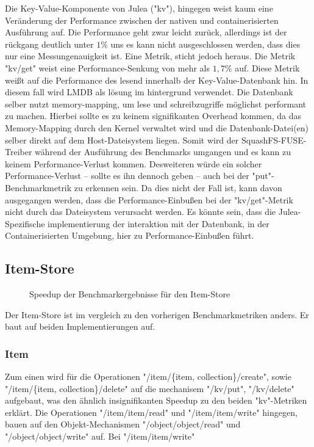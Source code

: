 \FloatBarrier

Die Key-Value-Komponente von Julea ("kv"), hingegen weist kaum eine Veränderung der Performance zwischen der nativen und containerisierten Ausführung auf. Die Performance geht zwar leicht zurück, allerdings ist der rückgang deutlich unter $1\%$ uns es kann nicht ausgeschlossen werden, dass dies nur eine Messungenauigkeit ist. Eine Metrik, sticht jedoch heraus. Die Metrik "kv/get" weist eine Performance-Senkung von mehr als $1,7\%$ auf. Diese Metrik weißt auf die Performance des lesend innerhalb der Key-Value-Datenbank hin. In diesem fall wird LMDB als lösung im hintergrund verwendet. Die Datenbank selber nutzt memory-mapping, um lese und schreibzugriffe möglichst performant zu machen. Hierbei sollte es zu keinem signifikanten Overhead kommen, da das Memory-Mapping durch den Kernel verwaltet wird und die Datenbank-Datei(en) selber direkt auf dem Host-Dateisystem liegen. Somit wird der SquashFS-FUSE-Treiber während der Ausführung des Benchmarks umgangen und es kann zu keinem Performance-Verlust kommen. Desweiteren würde ein solcher Performance-Verlust – sollte es ihn dennoch geben – auch bei der "put"-Benchmarkmetrik zu erkennen sein. Da dies nicht der Fall ist, kann davon ausgegangen werden, dass die Performance-Einbußen bei der "kv/get"-Metrik nicht durch das Dateisystem verursacht werden. Es könnte sein, dass die Julea-Spezifische implementierung der interaktion mit der Datenbank, in der Containerisierten Umgebung, hier zu Performance-Einbußen führt. 

\subsection{Item-Store}

\begin{figure}[H]
    \centering
    
    \caption{Speedup der Benchmarkergebnisse für den Item-Store}
    \label{fig:speedup_item}
\end{figure}

\FloatBarrier

Der Item-Store ist im vergleich zu den vorherigen Benchmarkmetriken anders. Er baut auf beiden Implementierungen auf.

\subsubsection{Item}

Zum einen wird für die Operationen "/item/\{item, collection\}/create", sowie "/item/\{item, collection\}/delete" auf die mechanisem "/kv/put", "/kv/delete" aufgebaut, was den ähnlich insignifikanten Speedup zu den beiden "kv"-Metriken erklärt. 
Die Operationen "/item/item/read" und "/item/item/write" hingegen, bauen auf den Objekt-Mechanismen "/object/object/read" und "/object/object/write" auf. Bei "/item/item/write"

